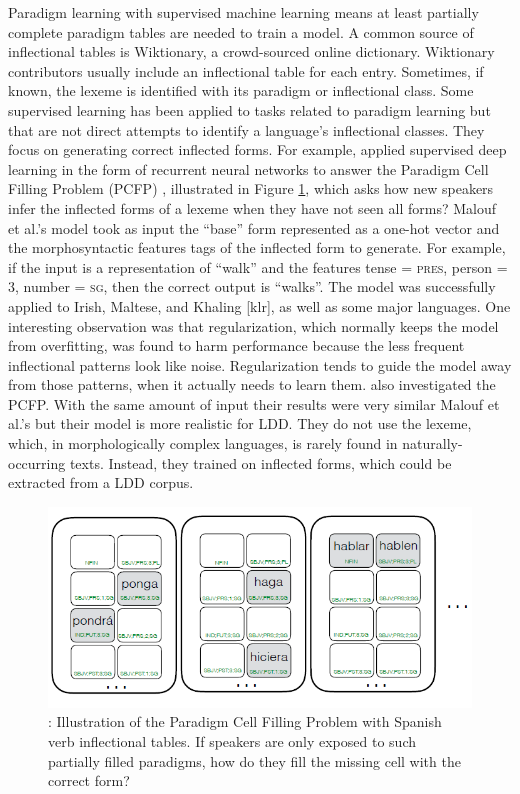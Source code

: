 \documentclass[12pt]{article}
\begin{document}
Paradigm learning with supervised machine learning means at least partially complete paradigm tables are needed to train a model. A common source of inflectional tables is Wiktionary, a crowd-sourced online dictionary. Wiktionary contributors usually include an inflectional table for each entry. Sometimes, if known, the lexeme is identified with its paradigm or inflectional class. Some supervised learning has been applied to tasks related to paradigm learning but that are not direct attempts to identify a language's inflectional classes. They focus on generating correct inflected forms. For example,  applied supervised deep learning in the form of recurrent neural networks to answer the Paradigm Cell Filling Problem (PCFP) \cite{Ackerman_partsand}, illustrated in Figure \ref{fig:PCFP}, which asks how new speakers infer the inflected forms of a lexeme when they have not seen all forms? Malouf et al.'s model took as input the ``base'' form represented as a one-hot vector and the morphosyntactic features tags of the inflected form to generate. For example, if the input is a representation of ``walk'' and the features tense = \textsc{pres}, person = \textsc{3}, number = \textsc{sg}, then the correct output is ``walks''. The model was successfully applied to Irish, Maltese, and Khaling [klr], as well as some major languages. One interesting observation was that regularization, which normally keeps the model from overfitting, was found to harm performance because the less frequent inflectional patterns look like noise. Regularization tends to guide the model away from those patterns, when it actually needs to learn them.  also investigated the PCFP. With the same amount of input their results were very similar Malouf et al.'s but their model is more realistic for LDD. They do not use the lexeme, which, in morphologically complex languages, is rarely found in naturally-occurring texts. Instead, they trained on inflected forms, which could be extracted from a LDD corpus. 

\begin{figure}[ht]
\label{fig:PCFP}
\begin{center}
\includegraphics[width=0.7\columnwidth]{PCFP.PNG}
\caption{: Illustration of the Paradigm Cell Filling Problem with Spanish verb inflectional tables. If speakers are only exposed to such partially filled paradigms, how do they fill the missing cell with the correct form?}
\end{center}
\end{figure}
\end{document}
